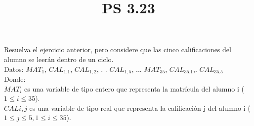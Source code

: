 \documentclass[11pt]{amsart}
\title{PS 3.23}
\begin{document}
\maketitle
Resuelva el ejercicio anterior, pero considere que las cinco calificaciones del alumno se leerán dentro de un ciclo.\\

Datos: $MAT_1$, $CAL_{1.1}$, $CAL_{1,2}$, . . $CAL_{1,5}$, ... $MAT_{35}$, $CAL_{35.1}$,.  $CAL_{35.5}$ \\

Donde:\\

$MAT_i$  es una variable de tipo entero que representa la matrícula del alumno i ($1 \leq i \leq 35$).\\
$CAL{i,j}$ es una variable de tipo real que representa la calificación j del alumno i ($1 \leq j \leq 5,1 \leq i \leq 35$).
\end{document}
